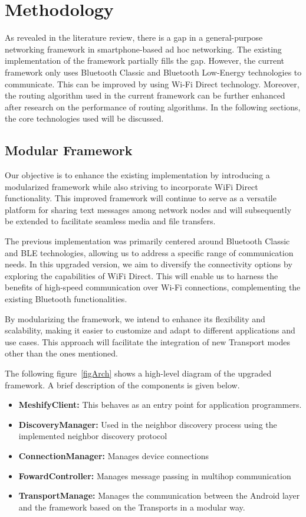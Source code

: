 \section{Methodology}

As revealed in the literature review, there is a gap in a general-purpose
networking framework in smartphone-based ad hoc networking. The existing
implementation of the framework partially fills the gap. However, the current
framework only uses Bluetooth Classic and Bluetooth Low-Energy technologies to
communicate. This can be improved by using Wi-Fi Direct technology. Moreover,
the routing algorithm used in the current framework can be further enhanced
after research on the performance of routing algorithms. In the following
sections, the core technologies used will be discussed.

\subsection{Modular Framework}

Our objective is to enhance the existing implementation by introducing a
modularized framework while also striving to incorporate WiFi Direct
functionality. This improved framework will continue to serve as a versatile
platform for sharing text messages among network nodes and will subsequently be
extended to facilitate seamless media and file transfers.

The previous implementation was primarily centered around Bluetooth Classic and
BLE technologies, allowing us to address a specific range of communication
needs. In this upgraded version, we aim to diversify the connectivity options
by exploring the capabilities of WiFi Direct. This will enable us to harness
the benefits of high-speed communication over Wi-Fi connections, complementing
the existing Bluetooth functionalities.

By modularizing the framework, we intend to enhance its flexibility and
scalability, making it easier to customize and adapt to different applications
and use cases. This approach will facilitate the integration of new Transport
modes other than the ones mentioned.

The following figure~\ref{figArch} shows a high-level diagram of the upgraded
framework. A brief description of the components is given below.

\begin{itemize}
    \item \textbf{MeshifyClient:} This behaves as an entry point for
          application programmers.
    \item \textbf{DiscoveryManager:} Used in the neighbor discovery process
          using the implemented neighbor discovery protocol
    \item \textbf{ConnectionManager:} Manages device connections
    \item \textbf{FowardController:} Manages message passing in multihop
          communication
    \item \textbf{TransportManage:} Manages the communication between the
          Android layer and the framework based on the Transports in a modular
          way.
\end{itemize}

